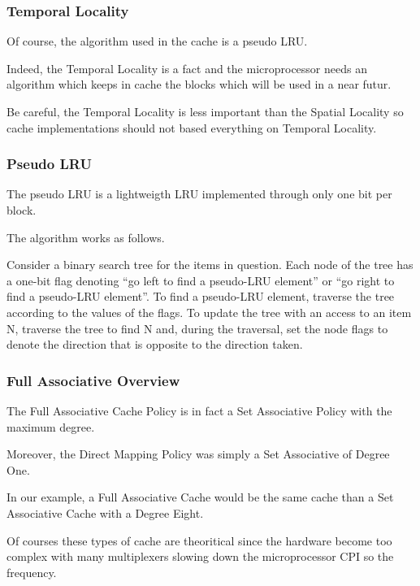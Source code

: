 
\begin{frame}
  \frametitle{Temporal Locality}

  Of course, the algorithm used in the cache is a pseudo LRU.

  \-

  Indeed, the Temporal Locality is a fact and the microprocessor needs
  an algorithm which keeps in cache the blocks which will be used in a near
  futur.

  \-

  Be careful, the Temporal Locality is less important than the Spatial
  Locality so cache implementations should not based everything on
  Temporal Locality.

  \begin{center}
  \end{center}
\end{frame}


\begin{frame}
  \frametitle{Pseudo LRU}

  The pseudo LRU is a lightweigth LRU implemented through only one bit
  per block.

  \-

  The algorithm works as follows.

  \-

  Consider a binary search tree for the items in question. Each node of
  the tree has a one-bit flag denoting ``go left to find a pseudo-LRU element''
  or ``go right to find a pseudo-LRU element''. To find a pseudo-LRU element,
  traverse the tree according to the values of the flags. To update the
  tree with an access to an item N, traverse the tree to find N and, during
  the traversal, set the node flags to denote the direction that is opposite
  to the direction taken.
\end{frame}


\begin{frame}
  \frametitle{Full Associative Overview}

  The Full Associative Cache Policy is in fact a Set Associative Policy
  with the maximum degree.

  \-

  Moreover, the Direct Mapping Policy was simply a Set Associative of
  Degree One.

  \-

  In our example, a Full Associative Cache would be the same cache than a
  Set Associative Cache with a Degree Eight.

  \-

  Of courses these types of cache are theoritical since the
  hardware become too complex with many multiplexers slowing down
  the microprocessor CPI so the frequency.
\end{frame}

